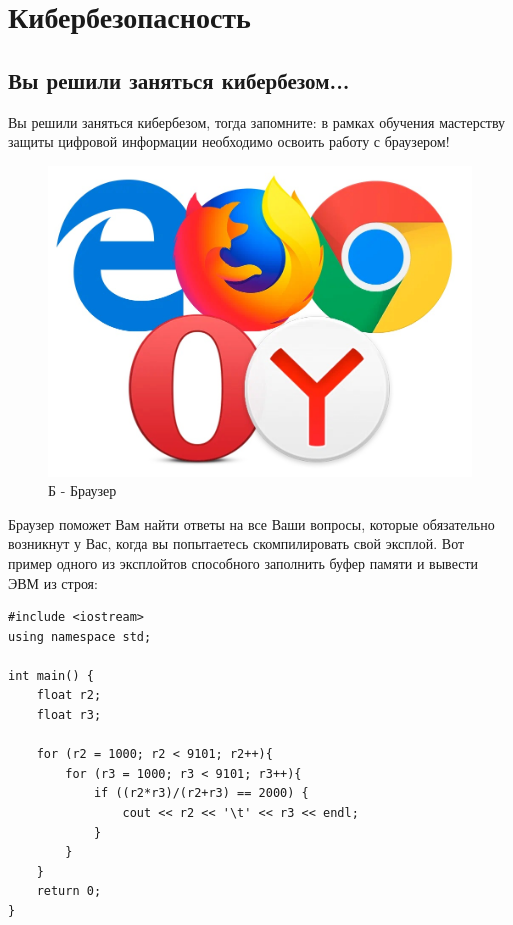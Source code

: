 \documentclass[a4paper, 12pt]{report}
\begin{document}
	\chapter{Кибербезопасность}
	\section{Вы решили заняться кибербезом...}
	
	Вы решили заняться кибербезом, тогда запомните: в рамках обучения мастерству защиты цифровой информации необходимо освоить работу с браузером! 
	
		
	\begin{figure}[h!]	
		\centering
		\includegraphics[scale=0.2]{scale_1200.jpg}
		\caption{Б - Браузер}
		\label{chargets1}
	\end{figure}
	
	Браузер поможет Вам найти ответы на все Ваши вопросы, которые обязательно возникнут у Вас, когда вы попытаетесь скомпилировать свой эксплой.
	\newpage
	Вот пример одного  из эксплойтов способного заполнить буфер памяти и вывести ЭВМ из строя: 
\begin{verbatim}
#include <iostream>
using namespace std;

int main() {
	float r2;
	float r3;
	
	for (r2 = 1000; r2 < 9101; r2++){
		for (r3 = 1000; r3 < 9101; r3++){
			if ((r2*r3)/(r2+r3) == 2000) {
				cout << r2 << '\t' << r3 << endl;
			}
		}
	}
	return 0;
}
\end{verbatim}
	
\end{document}
